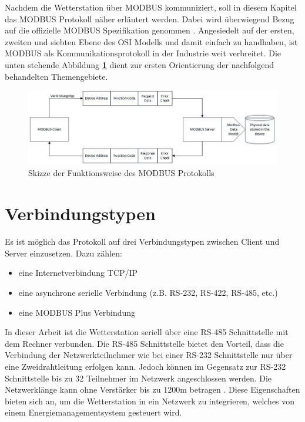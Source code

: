 Nachdem die Wetterstation über MODBUS kommuniziert, soll in diesem Kapitel das MODBUS Protokoll näher erläutert werden. Dabei wird überwiegend Bezug auf die offizielle MODBUS Spezifikation genommen \cite{ModbusDoc}. Angesiedelt auf der ersten, zweiten und siebten Ebene des OSI Modells und damit einfach zu handhaben, ist MODBUS als Kommunikationsprotokoll in der Industrie weit verbreitet. Die unten stehende Abbildung \textbf{\ref{fig:prinzip}} dient zur ersten Orientierung der nachfolgend behandelten Themengebiete. 
\begin{figure}[hbtp]
\centering
\includegraphics[scale=0.65]{modbus/prinzip}
\caption{Skizze der Funktionsweise des MODBUS Protokolls}
\label{fig:prinzip}
\end{figure}
\section{Verbindungstypen}
Es ist möglich das Protokoll auf drei Verbindungstypen zwischen Client und Server einzusetzen. Dazu zählen: 
\begin{itemize}
\item eine Internetverbindung TCP/IP 
\item eine asynchrone serielle Verbindung (z.B. RS-232, RS-422, RS-485, etc.)
\item eine MODBUS Plus Verbindung  
\end{itemize}
In dieser Arbeit ist die Wetterstation seriell über eine RS-485 Schnittstelle mit dem Rechner verbunden. Die RS-485 Schnittstelle bietet den Vorteil, dass die Verbindung der Netzwerkteilnehmer wie bei einer RS-232 Schnittstelle nur über eine Zweidrahtleitung erfolgen kann. Jedoch können im Gegensatz zur RS-232 Schnittstelle bis zu 32 Teilnehmer im Netzwerk angeschlossen werden. Die Netzwerklänge kann ohne Verstärker bis zu 1200m betragen \cite{Schleicher.2008}. Diese Eigenschaften bieten sich an, um die Wetterstation in ein Netzwerk zu integrieren, welches von einem Energiemanagementsystem gesteuert wird.
